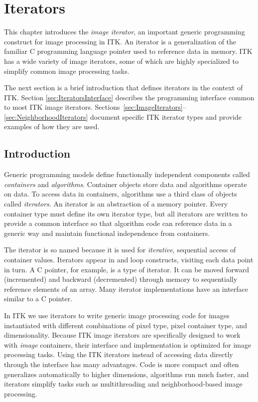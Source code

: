 \chapter{Iterators}
\label{sec:ImageIteratorsChapter}
This chapter introduces the \emph{image iterator}, an important generic
programming construct for image processing in ITK.  An iterator is a
generalization of the familiar C programming language pointer used to
reference data in memory.  ITK has a wide variety of image iterators, some of
which are highly specialized to simplify common image processing tasks.

The next section is a brief introduction that defines iterators in the context
of ITK.  Section \ref{sec:IteratorsInterface} describes the programming
interface common to most ITK image iterators.
Sections~\ref{sec:ImageIterators}--\ref{sec:NeighborhoodIterators} document
specific ITK iterator types and provide examples of how they are used.

\section{Introduction}
\label{sec:IteratorsIntroduction}
Generic programming models define functionally independent components called
\emph{containers} and \emph{algorithms}.  Container objects store data and
algorithms operate on data.  To access data in containers, algorithms use a
third class of objects called \emph{iterators}.  An iterator is an
abstraction of a memory pointer.  Every container type must define its own
iterator type, but all iterators are written to provide a common interface so
that algorithm code can reference data in a generic way and maintain
functional independence from containers.

The iterator is so named because it is used for \emph{iterative}, sequential
access of container values.  Iterators appear in  and
 loop constructs, visiting each data point in turn.  
A C pointer, for example, is a type of iterator.  It can be moved
forward (incremented) and backward (decremented) through memory to
sequentially reference elements of an array. Many iterator implementations
have an interface similar to a C pointer.

In ITK we use iterators to write generic image processing code for images
instantiated with different combinations of pixel type, pixel
container type, and dimensionality.  Because ITK image iterators are
specifically designed to work with \emph{image} containers, their interface and
implementation is optimized for image processing tasks.  Using the ITK
iterators instead of accessing data directly through the
 interface has many advantages. Code is more
compact and often generalizes automatically to higher dimensions, algorithms
run much faster, and iterators simplify tasks such as multithreading and
neighborhood-based image processing.


